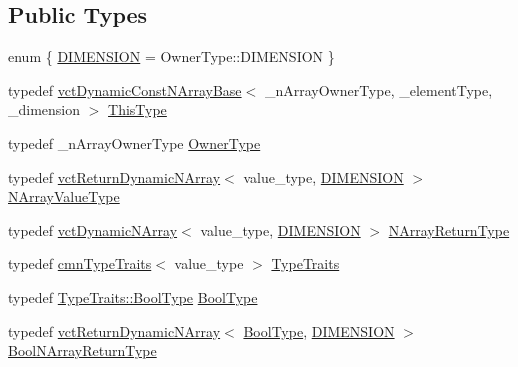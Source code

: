 \subsection*{Public Types}
\begin{DoxyCompactItemize}
\item 
enum \{ \hyperlink{classvct_dynamic_const_n_array_base_a815ac316ebc1bb2ab1969d307549826faf759c9ab831ff929b89af4ea2865a378}{D\+I\+M\+E\+N\+S\+I\+O\+N} = Owner\+Type\+:\+:D\+I\+M\+E\+N\+S\+I\+O\+N
 \}
\item 
typedef \hyperlink{classvct_dynamic_const_n_array_base}{vct\+Dynamic\+Const\+N\+Array\+Base}$<$ \+\_\+n\+Array\+Owner\+Type, \+\_\+element\+Type, \+\_\+dimension $>$ \hyperlink{classvct_dynamic_const_n_array_base_a5123caffcf1455a1b99003877eade897}{This\+Type}
\item 
typedef \+\_\+n\+Array\+Owner\+Type \hyperlink{classvct_dynamic_const_n_array_base_aad4328d01dc43be4b9047d594ed2ae8d}{Owner\+Type}
\item 
typedef \hyperlink{classvct_return_dynamic_n_array}{vct\+Return\+Dynamic\+N\+Array}$<$ value\+\_\+type, \hyperlink{classvct_dynamic_const_n_array_base_a815ac316ebc1bb2ab1969d307549826faf759c9ab831ff929b89af4ea2865a378}{D\+I\+M\+E\+N\+S\+I\+O\+N} $>$ \hyperlink{classvct_dynamic_const_n_array_base_a40632d0d6ab17d8fc3ea2097f889bffa}{N\+Array\+Value\+Type}
\item 
typedef \hyperlink{classvct_dynamic_n_array}{vct\+Dynamic\+N\+Array}$<$ value\+\_\+type, \hyperlink{classvct_dynamic_const_n_array_base_a815ac316ebc1bb2ab1969d307549826faf759c9ab831ff929b89af4ea2865a378}{D\+I\+M\+E\+N\+S\+I\+O\+N} $>$ \hyperlink{classvct_dynamic_const_n_array_base_a7507402a90022d7a14ad7038fac07041}{N\+Array\+Return\+Type}
\item 
typedef \hyperlink{classcmn_type_traits}{cmn\+Type\+Traits}$<$ value\+\_\+type $>$ \hyperlink{classvct_dynamic_const_n_array_base_ab1fc145860fe50454edfcfbe8347ccc1}{Type\+Traits}
\item 
typedef \hyperlink{classcmn_type_traits_aaa41087228a7f165bcd9f4385e644e28}{Type\+Traits\+::\+Bool\+Type} \hyperlink{classvct_dynamic_const_n_array_base_a16bf688936f61d1298ced8f637cfc1f8}{Bool\+Type}
\item 
typedef \hyperlink{classvct_return_dynamic_n_array}{vct\+Return\+Dynamic\+N\+Array}$<$ \hyperlink{classvct_dynamic_const_n_array_base_a16bf688936f61d1298ced8f637cfc1f8}{Bool\+Type}, \hyperlink{classvct_dynamic_const_n_array_base_a815ac316ebc1bb2ab1969d307549826faf759c9ab831ff929b89af4ea2865a378}{D\+I\+M\+E\+N\+S\+I\+O\+N} $>$ \hyperlink{classvct_dynamic_const_n_array_base_a983f2b7edd51a896d447383b5a5af289}{Bool\+N\+Array\+Return\+Type}
\end{DoxyCompactItemize}
